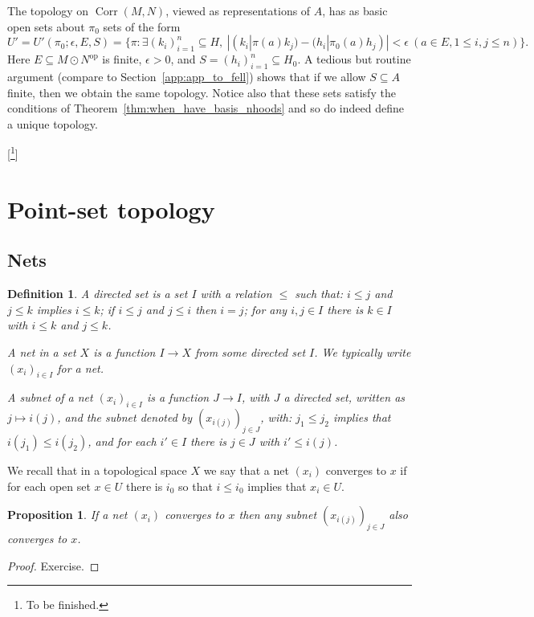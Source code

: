\documentclass[a4paper,11pt]{article}
\newcommand{\op}{{\operatorname{op}}}
\newcommand{\Corr}{{\operatorname{Corr}}}
\newtheorem{proposition}[lemma]{Proposition}
\newtheorem{definition}[lemma]{Definition}
\begin{document}
The topology on $\Corr(M,N)$, viewed as representations of $A$, has as basic
open sets about $\pi_0$ sets of the form
\[ U' = U'(\pi_0; \epsilon, E, S)
= \big\{ \pi : \exists (k_i)_{i=1}^n\subseteq H, \ 
|(k_i|\pi(a)k_j) - (h_i|\pi_0(a)h_j)|<\epsilon \ 
(a\in E, 1\leq i,j\leq n)
\big\}. \]
Here $E\subseteq M\odot N^\op$ is finite, $\epsilon>0$, and
$S=(h_i)_{i=1}^n \subseteq H_0$.  A tedious but routine argument
(compare to Section~\ref{app:app_to_fell}) shows that if
we allow $S\subseteq A$ finite, then we obtain the same topology.
Notice also that these sets satisfy the conditions of 
Theorem~\ref{thm:when_have_basis_nhoods} and so do indeed define a unique
topology.

[\footnote{To be finished.}]



\appendix
\section{Point-set topology}\label{app:one}

\subsection{Nets}

\begin{definition}
A \emph{directed set} is a set $I$ with a relation $\leq$ such that:
$i\leq j$ and $j\leq k$ implies $i\leq k$; if $i\leq j$ and $j\leq i$ then
$i=j$; for any $i,j\in I$ there is $k\in I$ with $i\leq k$ and $j\leq k$.

A \emph{net} in a set $X$ is a function $I\rightarrow X$ from some directed
set $I$.  We typically write $(x_i)_{i\in I}$ for a net.

A \emph{subnet} of a net $(x_i)_{i\in I}$ is a function $J\rightarrow I$,
with $J$ a directed set, written as $j\mapsto i(j)$, and the subnet denoted
by $(x_{i(j)})_{j\in J}$, with: $j_1\leq j_2$ implies that $i(j_1)\leq i(j_2)$,
and for each $i'\in I$ there is $j\in J$ with $i'\leq i(j)$.
\end{definition}

We recall that in a topological space $X$ we say that a net $(x_i)$ converges
to $x$ if for each open set $x\in U$ there is $i_0$ so that $i\leq i_0$ implies
that $x_i\in U$.

\begin{proposition}
If a net $(x_i)$ converges to $x$ then any subnet $(x_{i(j)})_{j\in J}$
also converges to $x$.
\end{proposition}
\begin{proof}
Exercise.
\end{proof}
\end{document}
